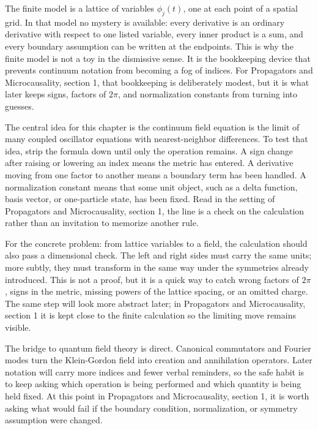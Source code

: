 The finite model is a lattice of variables \(\phi_j(t)\), one at each point of a spatial grid.  In that model no mystery is available: every derivative is an ordinary derivative with respect to one listed variable, every inner product is a sum, and every boundary assumption can be written at the endpoints.  This is why the finite model is not a toy in the dismissive sense.  It is the bookkeeping device that prevents continuum notation from becoming a fog of indices.  For Propagators and Microcausality, section 1, that bookkeeping is deliberately modest, but it is what later keeps signs, factors of \(2\pi\), and normalization constants from turning into guesses.

The central idea for this chapter is the continuum field equation is the limit of many coupled oscillator equations with nearest-neighbor differences.  To test that idea, strip the formula down until only the operation remains.  A sign change after raising or lowering an index means the metric has entered.  A derivative moving from one factor to another means a boundary term has been handled.  A normalization constant means that some unit object, such as a delta function, basis vector, or one-particle state, has been fixed.  Read in the setting of Propagators and Microcausality, section 1, the line is a check on the calculation rather than an invitation to memorize another rule.

For the concrete problem: from lattice variables to a field, the calculation should also pass a dimensional check.  The left and right sides must carry the same units; more subtly, they must transform in the same way under the symmetries already introduced.  This is not a proof, but it is a quick way to catch wrong factors of \(2\pi\), signs in the metric, missing powers of the lattice spacing, or an omitted charge.  The same step will look more abstract later; in Propagators and Microcausality, section 1 it is kept close to the finite calculation so the limiting move remains visible.

The bridge to quantum field theory is direct.  Canonical commutators and Fourier modes turn the Klein-Gordon field into creation and annihilation operators.  Later notation will carry more indices and fewer verbal reminders, so the safe habit is to keep asking which operation is being performed and which quantity is being held fixed.  At this point in Propagators and Microcausality, section 1, it is worth asking what would fail if the boundary condition, normalization, or symmetry assumption were changed.


